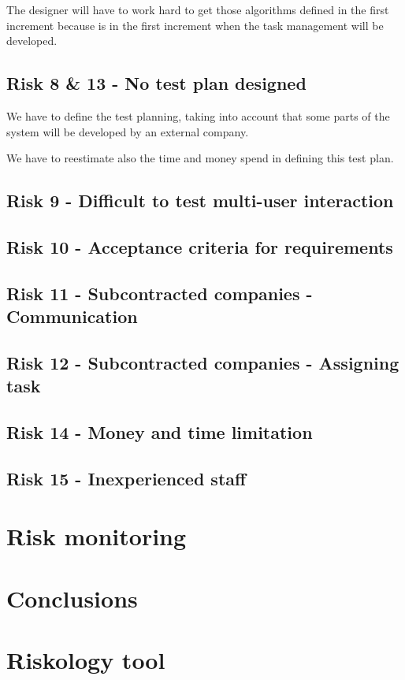 \documentclass[11pt]{article}
\begin{document}
The designer will have to work hard to get those algorithms defined in the first increment because is in the first increment when the task management will be developed.

\subsection{Risk 8 \& 13 - No test plan designed}
We have to define the test planning, taking into account that some parts of the system will be developed by an external company. 

We have to reestimate also the time and money spend in defining this test plan.

\subsection{Risk 9 - Difficult to test multi-user interaction}

\subsection{Risk 10 - Acceptance criteria for requirements}
\subsection{Risk 11 - Subcontracted companies - Communication}
\subsection{Risk 12 - Subcontracted companies - Assigning task}
\subsection{Risk 14 - Money and time limitation}
\subsection{Risk 15 - Inexperienced staff}




\section{Risk monitoring}


\section{Conclusions}

\appendix

\section{Riskology tool}
\end{document}
